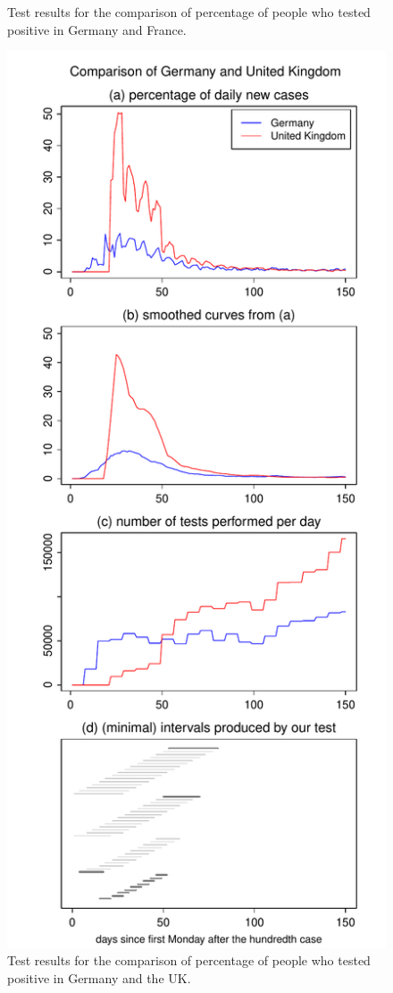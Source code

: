 \documentclass[a4paper,12pt]{article}
\numberwithin{equation}{section}
\begin{document}
\begin{figure}[h!]
\begin{minipage}[t]{0.49\textwidth}
\caption{Test results for the comparison of percentage of people who tested positive in Germany and France.}
\end{minipage}
\hspace{0.25cm}
\begin{minipage}[t]{0.49\textwidth}
\includegraphics[width=\textwidth]{plots/DEU_vs_GBR_normalised}
\caption{Test results for the comparison of percentage of people who tested positive in Germany and the UK.}
\end{minipage}
\end{figure}
\end{document}
